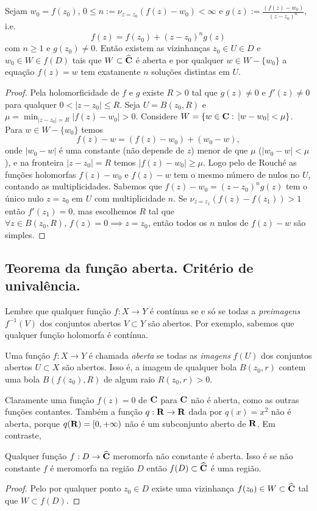 \begin{lema}
\label{l:n-raizes}
Sejam $w_0 =f(z_0)$,
$0\leq n := \nu_{z=z_0}(f(z)-w_0) < \infty$ e $g(z) := \frac{(f(z)-w_0)}{(z-z_0)^n}$,
i.e. 
\[ f(z) = f(z_0) + (z-z_0)^n g(z) \]
 com $n\geq 1$ e $g(z_0)\neq 0$.
Então existem as vizinhanças $z_0 \in U \in D$ e $w_0 \in W \in f(D)$
tais que $W\subset\widehat{\mathbf{C}}$ é aberta e por qualquer $w\in W-\{w_0\}$
a equação $f(z) = w$ tem exatamente $n$ soluções distintas em $U$.
\end{lema}
\begin{proof}
Pela holomorficidade de $f$ e $g$ existe $R>0$ tal que $g(z)\neq 0$
e $f'(z)\neq 0$ para
qualquer $0<|z-z_0|\leq R$. Seja $U = B(z_0,R)$ e 
$\mu = \min_{|z-z_0|=R} |f(z)-w_0| > 0$. Considere $W = \{ w\in\mathbf{C}:\, |w-w_0|<\mu \}$.
Para $w\in W - \{w_0\}$ temos
\[ f(z) - w = (f(z) - w_0) + (w_0-w), \]
onde $|w_0-w|$ é uma constante (não depende de $z$) menor de que $\mu$ ($|w_0-w|<\mu$),
e na fronteira $|z-z_0|=R$ temos
$|f(z) - w_0| \geq \mu$. Logo pelo  de Rouché
as funções holomorfas $f(z)-w_0$ e $f(z)-w$ tem o mesmo número de nulos no $U$, contando as multiplicidades.
Sabemos que $f(z)-w_0 = (z-z_0)^n g(z)$ tem o único nulo $z=z_0$ em $U$ com multiplicidade $n$.
Se $\nu_{z=z_1}(f(z)-f(z_1))>1$ então $f'(z_1)=0$, mas escolhemos $R$ tal que 
$\forall z\in B(z_0,R),\,f(z)=0 \implies z=z_0$, então todos os $n$ nulos de $f(z)-w$ são simples.
\end{proof}

\subsection{Teorema da função aberta. Critério de univalência.}
Lembre que qualquer função $f: X\to Y$ é contínua se e só se
todas a \emph{preimagens} $f^{-1}(V)$ dos conjuntos abertos $V\subset Y$ são abertos.
Por exemplo, sabemos que qualquer função holomorfa é contínua.

Uma função $f: X\to Y$ é chamada \emph{aberta} se todas as \emph{imagens} $f(U)$
dos conjuntos abertos $U\subset X$ são abertos. Isso é, a imagem de qualquer bola $B(z_0,r)$
contem uma bola $B(f(z_0),R)$ de algum raio $R(z_0,r)>0$.

Claramente uma função $f(z) = 0$ de $\mathbf{C}$ para $\mathbf{C}$ não é aberta, como as outras funções contantes.
Também a função $q: \mathbf{R} \to \mathbf{R}$ dada por $q(x) = x^2$ não é aberta,
porque $q(\mathbf{R}) = [0,+\infty)$ não é um subconjunto aberto de $\mathbf{R}$.
Em contraste,
\begin{teorema}
Qualquer função $f: D\to \widehat{\mathbf{C}}$ meromorfa não constante é aberta.
Isso é se não constante $f$ é meromorfa na região $D$ então $f(D) \subset \widehat{\mathbf{C}}$ é uma região.
\end{teorema}
\begin{proof}
Pelo  por qualquer ponto $z_0\in D$ existe uma vizinhança $f(z_0) \in W \subset \widehat{\mathbf{C}}$
tal que $W\subset f(D)$.
\end{proof}

